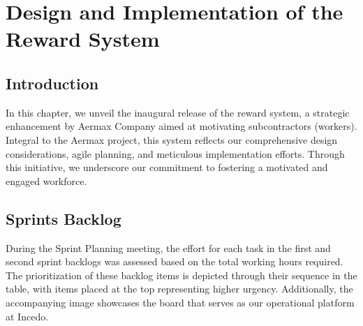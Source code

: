 \chapter{Design and Implementation of the Reward System}
\minitoc
\newpage

\setcounter{secnumdepth}{0} %
\section{Introduction}

In this chapter, we unveil the inaugural release of the reward system, a strategic enhancement by Aermax Company aimed at motivating subcontractors (workers). Integral to the Aermax project, this system reflects our comprehensive design considerations, agile planning, and meticulous implementation efforts. Through this initiative, we underscore our commitment to fostering a motivated and engaged workforce.

\section{Sprints Backlog}
During the Sprint Planning meeting, the effort for each task in the first and second sprint backlogs was assessed based on the total working hours required. The prioritization of these backlog items is depicted through their sequence in the table, with items placed at the top representing higher urgency. Additionally, the accompanying image showcases the board that serves as our operational platform at Incedo.

%     

